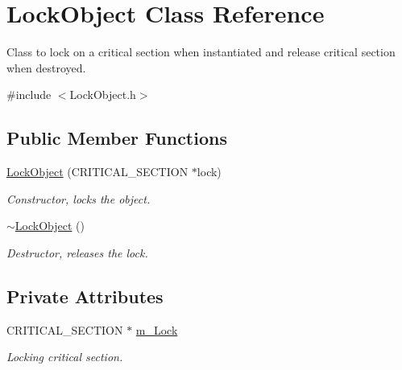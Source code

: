 \hypertarget{class_lock_object}{
\section{LockObject Class Reference}
\label{class_lock_object}
}


Class to lock on a critical section when instantiated and release critical section when destroyed.  




{\ttfamily \#include $<$LockObject.h$>$}

\subsection*{Public Member Functions}
\begin{DoxyCompactItemize}
\item 
\hyperlink{class_lock_object_a7dd8984cff813dfc896b4eac1cf7198a}{LockObject} (CRITICAL\_\-SECTION $\ast$lock)
\begin{DoxyCompactList}\small\item\em Constructor, locks the object. \end{DoxyCompactList}\item 
\hypertarget{class_lock_object_a1c6a979ea78f8c0c5d2c170fd362362e}{
\hyperlink{class_lock_object_a1c6a979ea78f8c0c5d2c170fd362362e}{$\sim$LockObject} ()}
\label{class_lock_object_a1c6a979ea78f8c0c5d2c170fd362362e}

\begin{DoxyCompactList}\small\item\em Destructor, releases the lock. \end{DoxyCompactList}\end{DoxyCompactItemize}
\subsection*{Private Attributes}
\begin{DoxyCompactItemize}
\item 
\hypertarget{class_lock_object_a5ac4687ca8b73e545a7cdb267c5f753c}{
CRITICAL\_\-SECTION $\ast$ \hyperlink{class_lock_object_a5ac4687ca8b73e545a7cdb267c5f753c}{m\_\-Lock}}
\label{class_lock_object_a5ac4687ca8b73e545a7cdb267c5f753c}

\begin{DoxyCompactList}\small\item\em Locking critical section. \end{DoxyCompactList}\end{DoxyCompactItemize}


